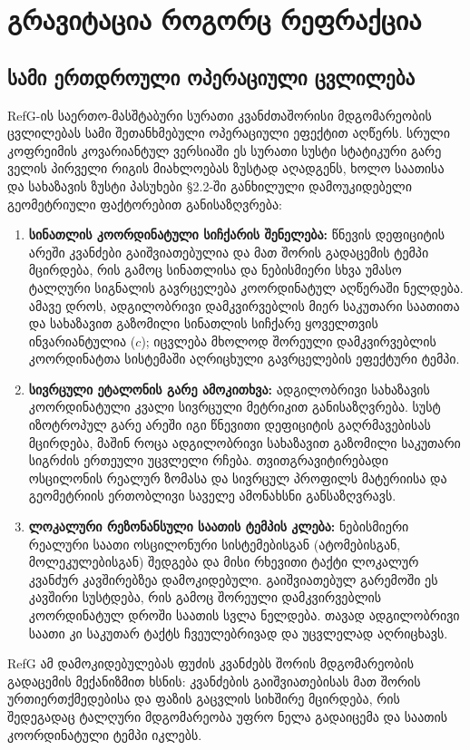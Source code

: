 \documentclass[11pt,a4paper]{article}
\begin{document}
\section{გრავიტაცია როგორც რეფრაქცია}

\subsection{სამი ერთდროული ოპერაციული ცვლილება}

RefG-ის საერთო-მასშტაბური სურათი კვანძთაშორისი მდგომარეობის ცვლილებას სამი შეთანხმებული ოპერაციული ეფექტით აღწერს. სრული კოფრეიმის კოვარიანტულ ვერსიაში ეს სურათი სუსტი სტატიკური გარე ველის პირველი რიგის მიახლოებას ზუსტად აღადგენს, ხოლო საათისა და სახაზავის ზუსტი პასუხები §2.2-ში განხილული დამოუკიდებელი გეომეტრიული ფაქტორებით განისაზღვრება:

\begin{enumerate}[label=\arabic*.]
\item \textbf{სინათლის კოორდინატული სიჩქარის შენელება:} წნევის დეფიციტის არეში კვანძები გაიშვიათებულია და მათ შორის გადაცემის ტემპი მცირდება, რის გამოც სინათლისა და ნებისმიერი სხვა უმასო ტალღური სიგნალის გავრცელება კოორდინატულ აღწერაში ნელდება. ამავე დროს, ადგილობრივი დამკვირვებლის მიერ საკუთარი საათითა და სახაზავით გაზომილი სინათლის სიჩქარე ყოველთვის ინვარიანტულია ($c$); იცვლება მხოლოდ შორეული დამკვირვებლის კოორდინატთა სისტემაში აღრიცხული გავრცელების ეფექტური ტემპი.
\item \textbf{სივრცული ეტალონის გარე ამოკითხვა:} ადგილობრივი სახაზავის კოორდინატული კვალი სივრცული მეტრიკით განისაზღვრება. სუსტ იზოტროპულ გარე არეში იგი წნევითი დეფიციტის გაღრმავებისას მცირდება, მაშინ როცა ადგილობრივი სახაზავით გაზომილი საკუთარი სიგრძის ერთეული უცვლელი რჩება. თვითგრავიტირებადი ოსცილონის რეალურ ზომასა და სივრცულ პროფილს მატერიისა და გეომეტრიის ერთობლივი საველე ამონახსნი განსაზღვრავს.
\item \textbf{ლოკალური რეზონანსული საათის ტემპის კლება:} ნებისმიერი რეალური საათი ოსცილონური სისტემებისგან (ატომებისგან, მოლეკულებისგან) შედგება და მისი რხევითი ტაქტი ლოკალურ კვანძურ კავშირებზეა დამოკიდებული. გაიშვიათებულ გარემოში ეს კავშირი სუსტდება, რის გამოც შორეული დამკვირვებლის კოორდინატულ დროში საათის სვლა ნელდება. თავად ადგილობრივი საათი კი საკუთარ ტაქტს ჩვეულებრივად და უცვლელად აღრიცხავს.

\end{enumerate}
RefG ამ დამოკიდებულებას ფუძის კვანძებს შორის მდგომარეობის გადაცემის მექანიზმით ხსნის: კვანძების გაიშვიათებისას მათ შორის ურთიერთქმედებისა და ფაზის გაცვლის სიხშირე მცირდება, რის შედეგადაც ტალღური მდგომარეობა უფრო ნელა გადაიცემა და საათის კოორდინატული ტემპი იკლებს.
\end{document}

